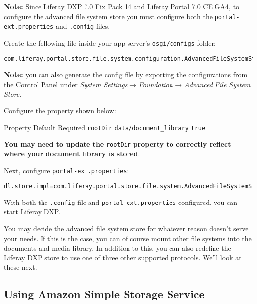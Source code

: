 \noindent\hrulefill

\textbf{Note:} Since Liferay DXP 7.0 Fix Pack 14 and Liferay Portal 7.0
CE GA4, to configure the advanced file system store you must configure
both the \texttt{portal-ext.properties} and \texttt{.config} files.

\noindent\hrulefill

Create the following file inside your app server's \texttt{osgi/configs}
folder:

\begin{verbatim}
com.liferay.portal.store.file.system.configuration.AdvancedFileSystemStoreConfiguration.cfg
\end{verbatim}

\noindent\hrulefill

\textbf{Note:} you can also generate the config file by exporting the
configurations from the Control Panel under \emph{System Settings} →
\emph{Foundation} → \emph{Advanced File System Store}.

\noindent\hrulefill

Configure the property shown below:

Property \textbar{} Default \textbar{} Required \texttt{rootDir}
\textbar{} \texttt{data/document\_library} \textbar{} \texttt{true}

\textbf{You may need to update the} \texttt{rootDir} \textbf{property to
correctly reflect where your document library is stored}.

Next, configure \texttt{portal-ext.properties}:

\begin{verbatim}
dl.store.impl=com.liferay.portal.store.file.system.AdvancedFileSystemStore
\end{verbatim}

With both the \texttt{.config} file and \texttt{portal-ext.properties}
configured, you can start Liferay DXP.

You may decide the advanced file system store for whatever reason
doesn't serve your needs. If this is the case, you can of course mount
other file systems into the documents and media library. In addition to
this, you can also redefine the Liferay DXP store to use one of three
other supported protocols. We'll look at these next.

\subsection{Using Amazon Simple Storage
Service}\label{using-amazon-simple-storage-service}

